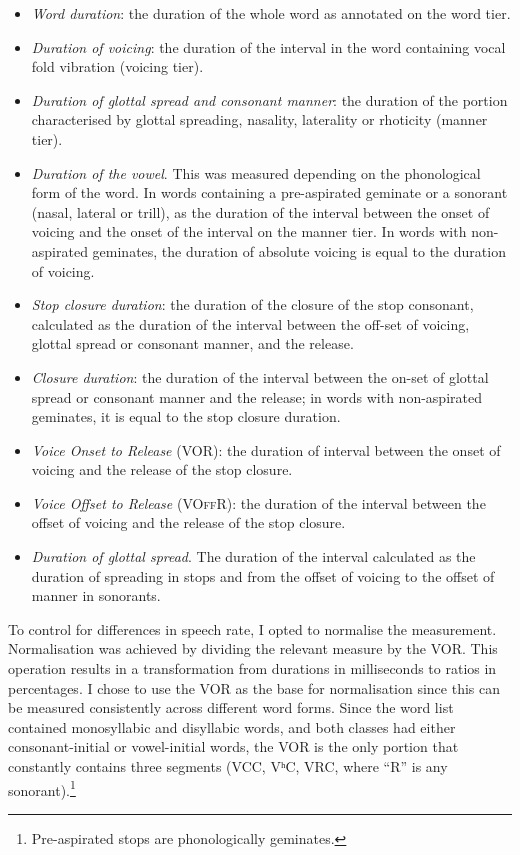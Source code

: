 \documentclass[11pt,a4paper,openany]{memoir}\usepackage[]{graphicx}\usepackage[]{color}
\begin{document}
\begin{itemize}
\item \textit{Word duration}: the duration of the whole word as annotated on the word tier.
\item \textit{Duration of voicing}: the duration of the interval in the word containing vocal fold vibration (voicing tier).
\item \textit{Duration of glottal spread and consonant manner}: the duration of the portion characterised by glottal spreading, nasality, laterality or rhoticity (manner tier).
\item \textit{Duration of the vowel}.
This was measured depending on the phonological form of the word.
In words containing a pre-aspirated geminate or a sonorant (nasal, lateral or trill), as the duration of the interval between the onset of voicing and the onset of the interval on the manner tier.
In words with non-aspirated geminates, the duration of absolute voicing is equal to the duration of voicing.
\item \textit{Stop closure duration}: the duration of the closure of the stop consonant, calculated as the duration of the interval between the off-set of voicing, glottal spread or consonant manner, and the release.
\item \textit{Closure duration}: the duration of the interval between the on-set of glottal spread or consonant manner and the release; in words with non-aspirated geminates, it is equal to the stop closure duration.
\item \textit{Voice Onset to Release} (VOR): the duration of interval between the onset of voicing and the release of the stop closure.
\item \textit{Voice Offset to Release} (\textsc{VOffR}): the duration of the interval between the offset of voicing and the release of the stop closure.
\item \textit{Duration of glottal spread}. The duration of the interval calculated as the duration of spreading in stops and from the offset of voicing to the offset of manner in sonorants.
\end{itemize}

To control for differences in speech rate, I opted to normalise the measurement.
Normalisation was achieved by dividing the relevant measure by the VOR.
This operation results in a transformation from durations in milliseconds to ratios in percentages.
I chose to use the VOR as the base for normalisation since this can be measured consistently across different word forms.
Since the word list contained monosyllabic and disyllabic words, and both classes had either consonant-initial or vowel-initial words, the VOR is the only portion that constantly contains three segments (VCC, VʰC, VRC, where ``R'' is any sonorant).\footnote{Pre-aspirated stops are phonologically geminates.}
\end{document}
